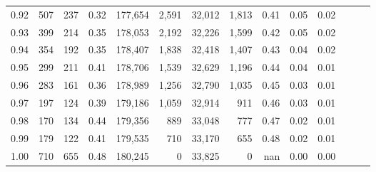 \begin{tabular}{rrrrrrrrrrrrrr}
0.92 &    507 &  237 &  0.32 &  177,654 &    2,591 &  32,012 &   1,813 &  0.41 &  0.05 &      0.02 \\
0.93 &    399 &  214 &  0.35 &  178,053 &    2,192 &  32,226 &   1,599 &  0.42 &  0.05 &      0.02 \\
0.94 &    354 &  192 &  0.35 &  178,407 &    1,838 &  32,418 &   1,407 &  0.43 &  0.04 &      0.02 \\
0.95 &    299 &  211 &  0.41 &  178,706 &    1,539 &  32,629 &   1,196 &  0.44 &  0.04 &      0.01 \\
0.96 &    283 &  161 &  0.36 &  178,989 &    1,256 &  32,790 &   1,035 &  0.45 &  0.03 &      0.01 \\
0.97 &    197 &  124 &  0.39 &  179,186 &    1,059 &  32,914 &     911 &  0.46 &  0.03 &      0.01 \\
0.98 &    170 &  134 &  0.44 &  179,356 &      889 &  33,048 &     777 &  0.47 &  0.02 &      0.01 \\
0.99 &    179 &  122 &  0.41 &  179,535 &      710 &  33,170 &     655 &  0.48 &  0.02 &      0.01 \\
1.00 &    710 &  655 &  0.48 &  180,245 &        0 &  33,825 &       0 &   nan &  0.00 &      0.00 \\
\bottomrule
\end{tabular}
